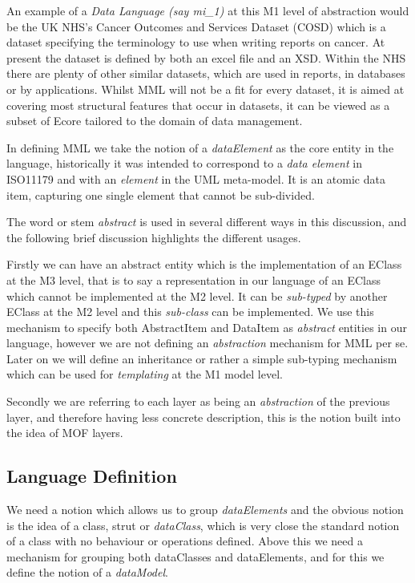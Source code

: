 \documentclass{llncs}
\begin{document}
	An example of a \emph{Data Language (say mi\_1)} at this M1 level of abstraction would be the UK NHS's Cancer Outcomes and Services Dataset (COSD) which is a dataset specifying the terminology to use when writing reports on cancer. At present the dataset is defined by both an excel file and an XSD.  Within the NHS there are plenty of other similar datasets, which are used in reports, in databases or by applications.  Whilst MML will not be a fit for every dataset, it is aimed at covering most structural features that occur in datasets, it can be viewed as a subset of Ecore tailored to the domain of data management.
	
	In defining MML we take the notion of a \emph{dataElement} as the core entity in the language, historically it was intended to correspond to a \emph{data element} in ISO11179 and with an \emph{element} in the UML meta-model. It is an atomic data item, capturing one single element that cannot be sub-divided.
	
	The word or stem \emph{abstract} is used in several different ways in this discussion, and the following brief discussion highlights the different usages.  
	
	Firstly we can have an abstract entity which is the implementation of an EClass at the M3 level, that is to say a representation in our language of an EClass which cannot be implemented at the M2 level. It can be \emph{sub-typed} by another EClass at the M2 level and this \emph{sub-class} can be implemented. We use this mechanism to specify both AbstractItem and DataItem as \emph{abstract} entities in our language, however we are not defining an \emph{abstraction} mechanism for MML per se. Later on we will define an inheritance or rather a simple sub-typing mechanism which can be used for \emph{templating} at the M1 model level. 
	
	Secondly we are referring to each layer as being an \emph{abstraction} of the previous layer, and therefore having less concrete description, this is the notion built into the idea of MOF layers. 
	
	
	
	
	
	\subsection{Language Definition}
	
	We need a notion which allows us to group \emph{dataElements} and the obvious notion is the idea of a class, strut or \emph{dataClass}, which is very close the standard notion of a class with no behaviour or operations defined. Above this we need a mechanism for grouping both dataClasses and dataElements, and for this we define the notion of a \emph{dataModel}. 
	
\end{document}
